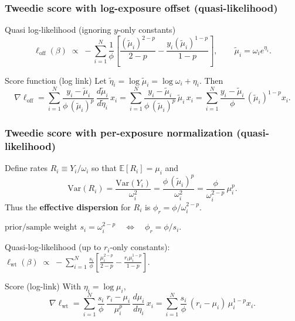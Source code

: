 \documentclass[10pt,aspectratio=169,xcolor={dvipsnames},usepdftitle=false]{beamer}
\begin{document}
\begin{frame}
\frametitle{Tweedie score with log-exposure offset (quasi-likelihood)}

\small
\begin{exampleblock}{Quasi log-likelihood (ignoring $y$-only constants)}
\[
\ell_{\text{off}}(\beta)
\;\propto\;
- \sum_{i=1}^N
\frac{1}{\phi}
\left[
  \frac{(\tilde{\mu}_i)^{2-p}}{2-p}
  - \frac{y_i(\tilde{\mu}_i)^{1-p}}{1-p}
\right],
\qquad
\tilde{\mu}_i = \omega_i e^{\eta_i}.
\]
\end{exampleblock}

\begin{block}{Score function (log link)}
Let $\tilde\eta_i=\log \tilde{\mu}_i=\log\omega_i+\eta_i$. Then
\[
\nabla \ell_{\mathrm{off}}
= \sum_{i=1}^N \frac{y_i-\tilde{\mu}_i}{\phi\,(\tilde{\mu}_i)^{p}}\,\frac{d\tilde{\mu}_i}{d\tilde\eta_i}\,x_i
= \sum_{i=1}^N \frac{y_i-\tilde{\mu}_i}{\phi\,(\tilde{\mu}_i)^{p}}\,\tilde{\mu}_i\,x_i
= \sum_{i=1}^N \frac{y_i-\tilde{\mu}_i}{\phi}\,(\tilde{\mu}_i)^{1-p} x_i.
\]
\end{block}
\end{frame}


\begin{frame}
\frametitle{Tweedie score with per-exposure normalization (quasi-likelihood)}
\small
Define rates $R_i \equiv Y_i/\omega_i$ so that $\mathbb{E}[R_i]=\mu_i$ and
\[
\mathrm{Var}(R_i)
= \frac{\mathrm{Var}(Y_i)}{\omega_i^2}
= \frac{\phi\,(\tilde\mu_i)^p}{\omega_i^2}
= \frac{\phi}{\omega_i^{2-p}}\,\mu_i^p.
\]
Thus the \textbf{effective dispersion} for $R_i$ is $\phi_r = \phi/\omega_i^{2-p}$.

$\text{prior/sample weight } s_i = \omega_i^{2-p} \quad\Longleftrightarrow\quad \phi_r=\phi/s_i.$

Quasi-log-likelihood (up to $r_i$-only constants):
$
\ell_{\mathrm{wt}}(\beta)
\;\propto\; -\sum_{i=1}^N \frac{s_i}{\phi}
\left[\frac{\mu_i^{2-p}}{2-p}-\frac{r_i\mu_i^{1-p}}{1-p}\right].
$
    
\begin{block}{Score (log-link)}
With $\eta_i=\log\mu_i$,
\[
\nabla \ell_{\mathrm{wt}}
= \sum_{i=1}^N \frac{s_i}{\phi}\,\frac{r_i-\mu_i}{\mu_i^{p}}\,\frac{d\mu_i}{d\eta_i}\,x_i
= \sum_{i=1}^N \frac{s_i}{\phi}\,(r_i-\mu_i)\,\mu_i^{1-p} x_i.
\]

\end{block}
\end{frame}
\end{document}

